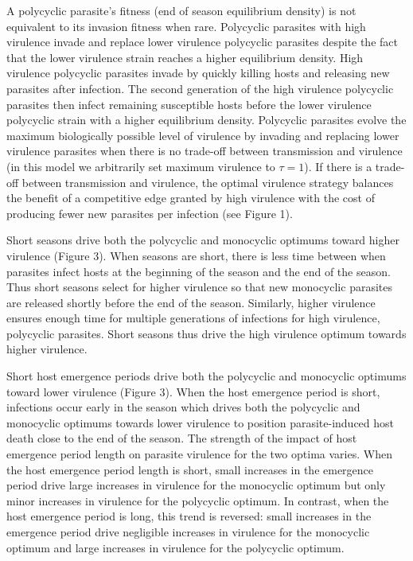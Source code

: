 \documentclass{article}
\begin{document}
A polycyclic parasite's fitness (end of season equilibrium density) is not equivalent to its invasion fitness when rare. Polycyclic parasites with high virulence invade and replace lower virulence polycyclic parasites despite the fact that the lower virulence strain reaches a higher equilibrium density. High virulence polycyclic parasites invade by quickly killing hosts and releasing new parasites after infection. The second generation of the high virulence polycyclic parasites then infect remaining susceptible hosts before the lower virulence polycyclic strain with a higher equilibrium density. Polycyclic parasites evolve the maximum biologically possible level of virulence by invading and replacing lower virulence parasites when there is no trade-off between transmission and virulence (in this model we arbitrarily set maximum virulence to $\tau=1$). If there is a trade-off between transmission and virulence, the optimal virulence strategy balances the benefit of a competitive edge granted by high virulence with the cost of producing fewer new parasites per infection (see Figure 1).

Short seasons drive both the polycyclic and monocyclic optimums toward higher virulence (Figure 3). When seasons are short, there is less time between when parasites infect hosts at the beginning of the season and the end of the season. Thus short seasons select for higher virulence so that new monocyclic parasites are released shortly before the end of the season.
Similarly, higher virulence ensures enough time for multiple generations of infections for high virulence, polycyclic parasites. Short seasons thus drive the high virulence optimum towards higher virulence.

Short host emergence periods drive both the polycyclic and monocyclic optimums toward lower virulence (Figure 3). When the host emergence period is short, infections occur early in the season which drives both the polycyclic and monocyclic optimums towards lower virulence to position parasite-induced host death close to the end of the season. The strength of the impact of host emergence period length on parasite virulence for the two optima varies. When the host emergence period length is short, small increases in the emergence period drive large increases in virulence for the monocyclic optimum but only minor increases in virulence for the polycyclic optimum. In contrast, when the host emergence period is long, this trend is reversed: small increases in the emergence period drive negligible increases in virulence for the monocyclic optimum and large increases in virulence for the polycyclic optimum.
\end{document}
